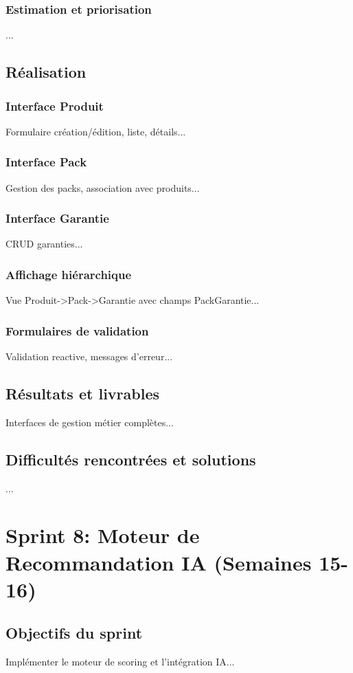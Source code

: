 \documentclass[12pt,a4paper]{report}
\begin{document}
\subsubsection{Estimation et priorisation}
...

\subsection{Réalisation}
\subsubsection{Interface Produit}
Formulaire création/édition, liste, détails...

\subsubsection{Interface Pack}
Gestion des packs, association avec produits...

\subsubsection{Interface Garantie}
CRUD garanties...

\subsubsection{Affichage hiérarchique}
Vue Produit->Pack->Garantie avec champs PackGarantie...

\subsubsection{Formulaires de validation}
Validation reactive, messages d'erreur...

\subsection{Résultats et livrables}
Interfaces de gestion métier complètes...

\subsection{Difficultés rencontrées et solutions}
...

\section{Sprint 8: Moteur de Recommandation IA (Semaines 15-16)}
\subsection{Objectifs du sprint}
Implémenter le moteur de scoring et l'intégration IA...
\end{document}
